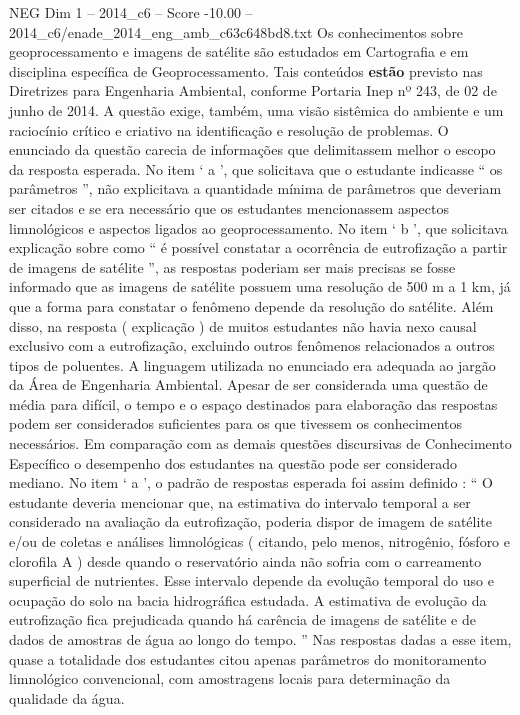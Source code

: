 \begin{textsample}{NEG Dim 1 – 2014\_c6 – Score -10.00 – 2014\_c6/enade\_2014\_eng\_amb\_c63c648bd8.txt}
Os conhecimentos sobre geoprocessamento e imagens de satélite são estudados em Cartografia e em disciplina específica de Geoprocessamento.
Tais conteúdos \textbf{estão} previsto nas Diretrizes para Engenharia Ambiental, conforme Portaria Inep nº 243, de 02 de junho de 2014.
A questão exige, também, uma visão sistêmica do ambiente e um raciocínio crítico e criativo na identificação e resolução de problemas.
O enunciado da questão carecia de informações que delimitassem melhor o escopo da resposta esperada.
No item ‘ a ’, que solicitava que o estudante indicasse “ os parâmetros ”, não explicitava a quantidade mínima de parâmetros que deveriam ser citados e se era necessário que os estudantes mencionassem aspectos limnológicos e aspectos ligados ao geoprocessamento.
No item ‘ b ’, que solicitava explicação sobre como “ é possível constatar a ocorrência de eutrofização a partir de imagens de satélite ”, as respostas poderiam ser mais precisas se fosse informado que as imagens de satélite possuem uma resolução de 500 m a 1 km, já que a forma para constatar o fenômeno depende da resolução do satélite.
Além disso, na resposta ( explicação ) de muitos estudantes não havia nexo causal exclusivo com a eutrofização, excluindo outros fenômenos relacionados a outros tipos de poluentes.
A linguagem utilizada no enunciado era adequada ao jargão da Área de Engenharia Ambiental.
Apesar de ser considerada uma questão de média para difícil, o tempo e o espaço destinados para elaboração das respostas podem ser considerados suficientes para os que tivessem os conhecimentos necessários.
Em comparação com as demais questões discursivas de Conhecimento Específico o desempenho dos estudantes na questão pode ser considerado mediano.
No item ‘ a ’, o padrão de respostas esperada foi assim definido : “ O estudante deveria mencionar que, na estimativa do intervalo temporal a ser considerado na avaliação da eutrofização, poderia dispor de imagem de satélite e/ou de coletas e análises limnológicas ( citando, pelo menos, nitrogênio, fósforo e clorofila A ) desde quando o reservatório ainda não sofria com o carreamento superficial de nutrientes.
Esse intervalo depende da evolução temporal do uso e ocupação do solo na bacia hidrográfica estudada.
A estimativa de evolução da eutrofização fica prejudicada quando há carência de imagens de satélite e de dados de amostras de água ao longo do tempo. ” Nas respostas dadas a esse item, quase a totalidade dos estudantes citou apenas parâmetros do monitoramento limnológico convencional, com amostragens locais para determinação da qualidade da água.

\end{textsample}
